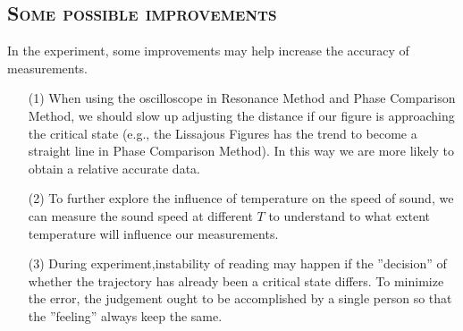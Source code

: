\documentclass[a4paper,12pt]{article}
\begin{document}
\subsection{\textsc{Some possible improvements}}
In the experiment, some improvements may help increase the accuracy of measurements.
\begin{itemize}
\item[(1)] When using the oscilloscope in Resonance Method and Phase Comparison Method, we should slow up adjusting the distance if our figure is approaching the critical state (e.g., the Lissajous Figures has the trend to become a straight line in Phase Comparison Method). In this way we are more likely to obtain a relative accurate data.
\item[(2)] To further explore the influence of temperature on the speed of sound, we can measure the sound speed at different $T$ to understand to what extent temperature will influence our measurements.
\item[(3)] During experiment,instability of reading may happen if the ”decision” of whether the trajectory has already been a critical state differs. To minimize the error, the judgement ought to be accomplished by a single person so that the ”feeling” always keep the same.
\end{itemize}
\end{document}
